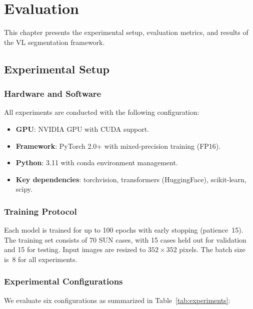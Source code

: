 
\chapter{Evaluation}
\label{ch:evaluation}

This chapter presents the experimental setup, evaluation metrics, and results of the \ac{VL} segmentation framework.

\section{Experimental Setup}
\label{sec:eval:setup}

\subsection{Hardware and Software}
\label{sec:eval:hardware}

All experiments are conducted with the following configuration:
\begin{itemize}
	\item \textbf{GPU}: NVIDIA GPU with CUDA support.
	\item \textbf{Framework}: PyTorch 2.0+ with mixed-precision training (FP16).
	\item \textbf{Python}: 3.11 with conda environment management.
	\item \textbf{Key dependencies}: torchvision, transformers (HuggingFace), scikit-learn, scipy.
\end{itemize}

\subsection{Training Protocol}
\label{sec:eval:protocol}

Each model is trained for up to 100 epochs with early stopping (patience~15). The training set consists of 70 SUN cases, with 15 cases held out for validation and 15 for testing. Input images are resized to $352 \times 352$ pixels. The batch size is~8 for all experiments.

\subsection{Experimental Configurations}
\label{sec:eval:configs}

We evaluate six configurations as summarized in Table~\ref{tab:experiments}:

